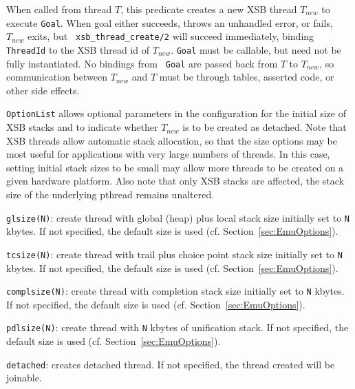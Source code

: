 \begin{description}

%
When called from thread $T$, this predicate creates a new XSB thread
$T_{new}$ to execute {\tt Goal}.  When goal either succeeds, throws an
unhandled error, or fails, $T_{new}$ exits, but {\tt
  xsb\_thread\_create/2} will succeed immediately, binding {\tt
  ThreadId} to the XSB thread id of $T_{new}$.  {\tt Goal} must be
callable, but need not be fully instantiated.  No bindings from {\tt
  Goal} are passed back from $T$ to $T_{new}$, so communication
between $T_{new}$ and $T$ must be through tables, asserted code, or
other side effects.

{\tt OptionList} allows optional parameters in the configuration for
the initial size of XSB stacks and to indicate whether $T_{new}$ is to
be created as detached.  Note that XSB threads allow automatic stack
allocation, so that the size options may be most useful for
applications with very large numbers of threads.  In this case,
setting initial stack sizes to be small may allow more threads to be
created on a given hardware platform.  Also note that only XSB stacks
are affected, the stack size of the underlying pthread remains
unaltered.
%
\bi
\item {\tt glsize(N)}: create thread with global (heap) plus local
  stack size initially set to {\tt N} kbytes.  If not specified, the
  default size is used (cf. Section~\ref{sec:EmuOptions}).
%
\item {\tt tcsize(N)}: create thread with trail plus choice point 
  stack size initially set to {\tt N} kbytes.  If not specified, the
  default size is used (cf. Section~\ref{sec:EmuOptions}).
%
\item {\tt complsize(N)}: create thread with completion
  stack size initially set to {\tt N} kbytes. If not specified, the
  default size is used (cf. Section~\ref{sec:EmuOptions}).
%
\item {\tt pdlsize(N)}: create thread with {\tt N} kbytes of
  unification stack.  If not specified, the
  default size is used (cf. Section~\ref{sec:EmuOptions}).
%
\item {\tt detached}: creates detached thread.  If not specified, the
  thread created will be joinable.
\ei


\end{description}
